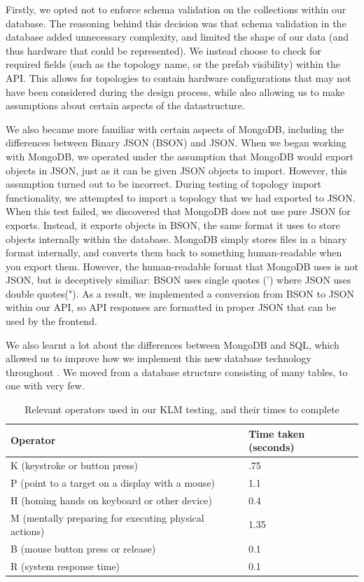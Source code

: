 \documentclass[11pt]{article}
\begin{document}
		Firstly, we opted not to enforce schema validation on the collections within our database.
		The reasoning behind this decision was that schema validation in the database added unnecessary complexity, and limited the shape of our data (and thus hardware that could be represented).
		We instead choose to check for required fields (such as the topology name, or the prefab visibility) within the API.
		This allows for topologies to contain hardware configurations that may not have been considered during the design process, while also allowing us to make assumptions about certain aspects of the datastructure.

		We also became more familiar with certain aspects of MongoDB, including the differences between Binary JSON (BSON) and JSON.
		When we began working with MongoDB, we operated under the assumption that MongoDB would export objects in JSON, just as it can be given JSON objects to import.
		However, this assumption turned out to be incorrect. 
		During testing of topology import functionality, we attempted to import a topology that we had exported to JSON.
		When this test failed, we discovered that MongoDB does not use pure JSON for exports.
		Instead, it exports objects in BSON, the same format it uses to store objects internally within the database.
		MongoDB simply stores files in a binary format internally, and converts them back to something human-readable when you export them. 
		However, the human-readable format that MongoDB uses is not JSON, but is deceptively similiar: BSON uses single quotes (') where JSON uses double quotes(").
		As a result, we implemented a conversion from BSON to JSON within our API, so API responses are formatted in proper JSON that can be used by the frontend.

		We also learnt a lot about the differences between MongoDB and SQL, which allowed us to improve how we implement this new database technology throughout \opendc{}.
		We moved from a database structure consisting of many tables, to one with very few.


\newpage

\begin{table}[]
\centering
	\begin{tabular}{ll}
	\toprule
	Operator                                              & Time taken (seconds) \\ \midrule
	K (keystroke or button press)                         & .75                  \\
	P (point to a target on a display with a mouse)       & 1.1                  \\
	H (homing hands on keyboard or other device)          & 0.4                  \\
	M (mentally preparing for executing physical actions) & 1.35                 \\
	B (mouse button press or release)                     & 0.1                  \\
	R (system response time)							  &	   0.1                  \\
	\bottomrule
	\end{tabular}
\caption{Relevant operators used in our KLM testing, and their times to complete}
\label{tab:3}
\end{table}
\end{document}

